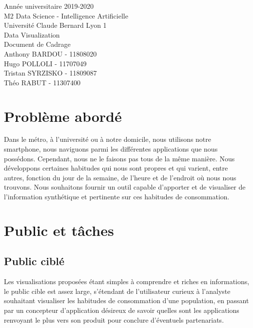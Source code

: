 \documentclass[a4paper, 11pt]{article}
\begin{document}
	\begin{titlepage}
		\begin{center}
			\Large{Année universitaire 2019-2020}\\
			\Large{M2 Data Science - Intelligence Artificielle}\\
			\Large{Université Claude Bernard Lyon 1}\\[1cm]
			\vspace{6cm}
			\huge{Data Visualization}\\
			Document de Cadrage\\
			\normalsize{
				\vspace{7cm}
                Anthony BARDOU - 11808020\\
                Hugo POLLOLI - 11707049\\
                Tristan SYRZISKO - 11809087\\
                Théo RABUT - 11307400\\
				}
			
			\medskip
			
			\vspace{2.5cm}
			
		\end{center}
	\end{titlepage}
	
	\newpage
	
	\tableofcontents
	
	\newpage
	
    \section{Problème abordé}
        Dans le métro, à l'université ou à notre domicile, nous utilisons notre smartphone, nous naviguons parmi les différentes applications que nous possédons. Cependant, nous ne le faisons pas tous de la même manière. Nous développons certaines habitudes qui nous sont propres et qui varient, entre autres, fonction du jour de la semaine, de l'heure et de l'endroit où nous nous trouvons. Nous souhaitons fournir un outil capable d'apporter et de visualiser de l'information synthétique et pertinente sur ces habitudes de consommation.
        
    \section{Public et tâches}
        \subsection{Public ciblé}
        Les visualisations proposées étant simples à comprendre et riches en informations, le public cible est assez large, s'étendant de l'utilisateur curieux à l'analyste souhaitant visualiser les habitudes de consommation d'une population, en passant par un concepteur d'application désireux de savoir quelles sont les applications renvoyant le plus vers son produit pour conclure d'éventuels partenariats.
\end{document}
